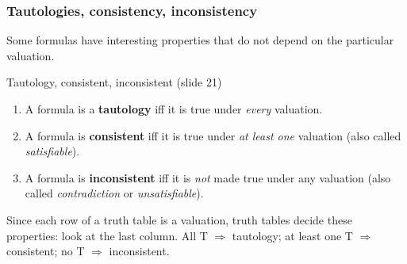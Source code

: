 \subsubsection{Tautologies, consistency, inconsistency}

Some formulas have interesting properties that do not depend on the particular valuation.

\begin{nbdef}{Tautology, consistent, inconsistent (slide 21)}
\begin{enumerate}[nosep]
  \item A formula is a \textbf{tautology} iff it is true under \emph{every} valuation.
  \item A formula is \textbf{consistent} iff it is true under \emph{at least one}
        valuation (also called \emph{satisfiable}).
  \item A formula is \textbf{inconsistent} iff it is \emph{not} made true under any
        valuation (also called \emph{contradiction} or \emph{unsatisfiable}).
\end{enumerate}
Since each row of a truth table is a valuation, truth tables decide these properties: look
at the last column. All T $\Rightarrow$ tautology; at least one T $\Rightarrow$ consistent;
no T $\Rightarrow$ inconsistent.
\end{nbdef}

\begin{center}
\end{center}

